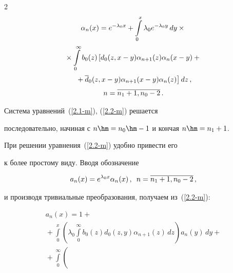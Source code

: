 \begin{multicols}{2}
\begin{multline}
\label{2.2-m}


\alpha_{n}(x)


= e^{-\lambda_0 x} 


+\int\limits_0^x \lambda_0 e^{-\lambda_0 y}\,dy\times{}\\[2pt]


{}\times


\int\limits_0^\infty b_0(z) \left[


d_0(z,x-y) \alpha_{n+1}(z) \alpha_{n}(x-y) + {}\right.\\[2pt]


\left.{}+ \d_0(z,x-y) \alpha_{n+1}(x-y) \alpha_{n}(z)


\right]  dz\,,\\[4pt]


n=\overline{n_1+1,n_0-2}\,.            %


\end{multline}


Система уравнений~(\ref{2.1-m}), (\ref{2.2-m}) решается


последовательно, начиная с $n\hm=n_0\hm-1$ и кончая $n\hm=n_1+1$.





При решении уравнения~(\ref{2.2-m}) удобно привести его


к более простому виду. Вводя обозначение


\begin{equation*}




a_{n}(x) = e^{\lambda_0 x} \alpha_{n}(x)\,,


\enskip  n=\overline{n_1+1,n_0-2}\,,


\end{equation*}


и производя тривиальные преобразования, получаем из~(\ref{2.2-m}):


\begin{multline}


\label{2.4-m}


a_{n}(x) = 1 +{}\\[2pt]


{}+ \int\limits_0^x \left(


\lambda_0 \int\limits_0^\infty b_0(z) d_0(z,y) \alpha_{n+1}(z)\, dz \right)


a_{n}(y)\, dy + {}\\[2pt]


{}+ \int\limits_0^\infty \left(



\end{multline}
\end{multicols}
